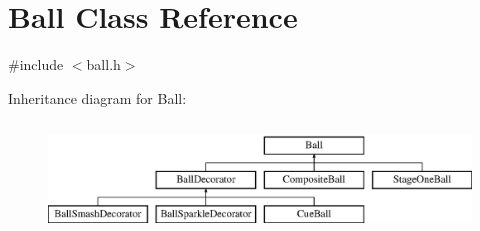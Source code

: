 \hypertarget{class_ball}{}\section{Ball Class Reference}
\label{class_ball}


{\ttfamily \#include $<$ball.\+h$>$}

Inheritance diagram for Ball\+:\begin{figure}[H]
\begin{center}
\leavevmode
\includegraphics[height=2.978723cm]{class_ball}
\end{center}
\end{figure}
